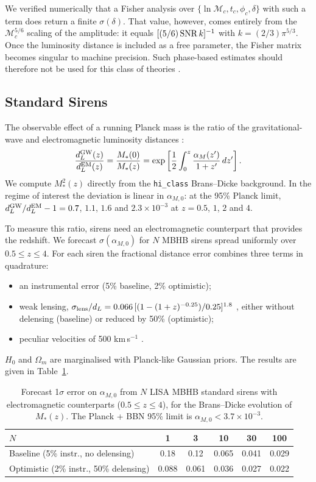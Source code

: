 \documentclass[11pt,a4paper]{article}
\begin{document}
We verified numerically that a Fisher analysis over $\{\ln\mathcal{M}_c, t_c, \phi_c, \delta\}$ with such a term does return a finite $\sigma(\delta)$. That value, however, comes entirely from the $\mathcal{M}_c^{5/6}$ scaling of the amplitude: it equals $[(5/6)\,{\rm SNR}\,k]^{-1}$ with $k = (2/3)\pi^{5/3}$. Once the luminosity distance is included as a free parameter, the Fisher matrix becomes singular to machine precision. Such phase-based estimates should therefore not be used for this class of theories \cite{Vallisneri2008}.

\subsection{Standard Sirens}
The observable effect of a running Planck mass is the ratio of the gravitational-wave and electromagnetic luminosity distances \cite{Belgacem2018,Lagos2019}:
\begin{equation}
\frac{d_L^{\rm GW}(z)}{d_L^{\rm EM}(z)} = \frac{M_*(0)}{M_*(z)} = \exp\left[ \frac{1}{2}\int_0^z \frac{\alpha_M(z')}{1+z'}\, dz' \right].
\end{equation}
We compute $M_*^2(z)$ directly from the \texttt{hi\_class} Brans--Dicke background. In the regime of interest the deviation is linear in $\alpha_{M,0}$: at the 95\% Planck limit, $d_L^{\rm GW}/d_L^{\rm EM} - 1 = 0.7$, $1.1$, $1.6$ and $2.3 \times 10^{-3}$ at $z = 0.5$, $1$, $2$ and $4$.

To measure this ratio, sirens need an electromagnetic counterpart that provides the redshift. We forecast $\sigma(\alpha_{M,0})$ for $N$ MBHB sirens spread uniformly over $0.5 \le z \le 4$. For each siren the fractional distance error combines three terms in quadrature:
\begin{itemize}
    \item an instrumental error (5\% baseline, 2\% optimistic);
    \item weak lensing, $\sigma_{\rm lens}/d_L = 0.066\,[(1-(1+z)^{-0.25})/0.25]^{1.8}$ \cite{Tamanini2016}, either without delensing (baseline) or reduced by 50\% (optimistic);
    \item peculiar velocities of 500 km\,s$^{-1}$ \cite{Kocsis2006}.
\end{itemize}
$H_0$ and $\Omega_m$ are marginalised with Planck-like Gaussian priors. The results are given in Table~\ref{tab:sirens}.

\begin{table}[H]
\centering
\caption{Forecast 1$\sigma$ error on $\alpha_{M,0}$ from $N$ LISA MBHB standard sirens with electromagnetic counterparts ($0.5 \le z \le 4$), for the Brans--Dicke evolution of $M_*(z)$. The Planck + BBN 95\% limit is $\alpha_{M,0} < 3.7\times10^{-3}$.}
\label{tab:sirens}
\begin{tabular}{lccccc}
\toprule
$N$ & 1 & 3 & 10 & 30 & 100 \\
\midrule
Baseline (5\% instr., no delensing) & 0.18 & 0.12 & 0.065 & 0.041 & 0.029 \\
Optimistic (2\% instr., 50\% delensing) & 0.088 & 0.061 & 0.036 & 0.027 & 0.022 \\
\bottomrule
\end{tabular}
\end{table}
\end{document}
